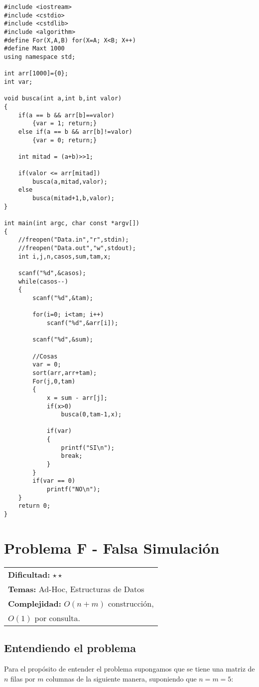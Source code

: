\begin{verbatim}
#include <iostream>
#include <cstdio>
#include <cstdlib>
#include <algorithm>
#define For(X,A,B) for(X=A; X<B; X++)
#define Maxt 1000
using namespace std;
 
int arr[1000]={0};
int var;
 
void busca(int a,int b,int valor)
{
    if(a == b && arr[b]==valor)
        {var = 1; return;}
    else if(a == b && arr[b]!=valor)
        {var = 0; return;}
 
    int mitad = (a+b)>>1;
 
    if(valor <= arr[mitad])
        busca(a,mitad,valor);
    else
        busca(mitad+1,b,valor);
}
 
int main(int argc, char const *argv[])
{
    //freopen("Data.in","r",stdin);
    //freopen("Data.out","w",stdout);
    int i,j,n,casos,sum,tam,x;
 
    scanf("%d",&casos);
    while(casos--)
    {
        scanf("%d",&tam);
 
        for(i=0; i<tam; i++)
            scanf("%d",&arr[i]);
 
        scanf("%d",&sum);
 
        //Cosas
        var = 0;
        sort(arr,arr+tam);
        For(j,0,tam)
        {
            x = sum - arr[j];
            if(x>0)
                busca(0,tam-1,x);
 
            if(var)
            {
                printf("SI\n");
                break;
            }
        }
        if(var == 0)
            printf("NO\n");
    }
    return 0;
}
\end{verbatim}

\section{Problema F - Falsa Simulación}

\hfill
\begin{tabular}{@{}l@{}}
\textbf{Dificultad:} $\star \star$ \\
\textbf{Temas:} Ad-Hoc, Estructuras de Datos\\
\textbf{Complejidad:} $O(n+m)$ construcción,\\ $O(1)$ por consulta.\\
\end{tabular}

\subsection*{Entendiendo el problema}
Para el propósito de entender el problema supongamos que se tiene una matriz de $n$ filas por $m$ columnas de la siguiente manera, suponiendo que $n = m = 5$:

